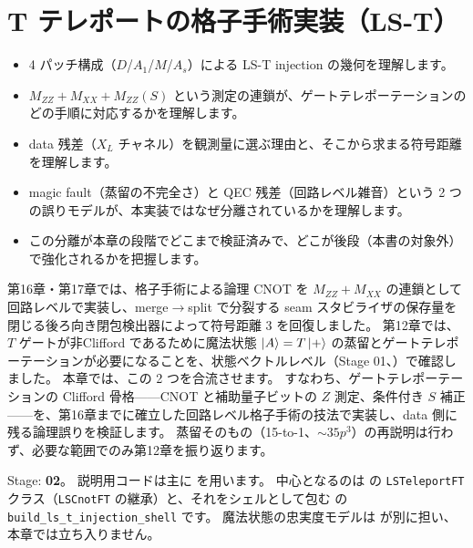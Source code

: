 \chapter{T テレポートの格子手術実装（LS-T）}\label{ch:ls_t}

\begin{chaptergoal}
  \begin{itemize}
  \item 4 パッチ構成（$D$/$A_1$/$M$/$A_s$）による LS-T injection の幾何を理解します。
  \item $M_{ZZ}+M_{XX}+M_{ZZ}(S)$ という測定の連鎖が、ゲートテレポーテーションのどの手順に対応するかを理解します。
  \item data 残差（$X_L$ チャネル）を観測量に選ぶ理由と、そこから求まる符号距離を理解します。
  \item magic fault（蒸留の不完全さ）と QEC 残差（回路レベル雑音）という 2 つの誤りモデルが、本実装ではなぜ分離されているかを理解します。
  \item この分離が本章の段階でどこまで検証済みで、どこが後段（本書の対象外）で強化されるかを把握します。
  \end{itemize}
\end{chaptergoal}

第16章・第17章では、格子手術による論理 CNOT を $M_{ZZ}+M_{XX}$ の連鎖として回路レベルで実装し、merge$\to$split で分裂する seam スタビライザの保存量を閉じる後ろ向き閉包検出器によって符号距離 3 を回復しました。
第12章では、$T$ ゲートが非Clifford であるために魔法状態 $\ket{A}=T\ket{+}$ の蒸留とゲートテレポーテーションが必要になることを、状態ベクトルレベル（Stage 01、）で確認しました。
本章では、この 2 つを合流させます。
すなわち、ゲートテレポーテーションの Clifford 骨格——CNOT と補助量子ビットの $Z$ 測定、条件付き $S$ 補正——を、第16章までに確立した回路レベル格子手術の技法で実装し、data 側に残る論理誤りを検証します。
蒸留そのもの（15-to-1、$\sim35p^3$）の再説明は行わず、必要な範囲でのみ第12章を振り返ります。

\begin{notebox}
  Stage: \textbf{02}。
  説明用コードは主に  を用います。
  中心となるのは  の \texttt{LSTeleportFT} クラス（\texttt{LSCnotFT} の継承）と、それをシェルとして包む  の \texttt{build\_ls\_t\_injection\_shell} です。
  魔法状態の忠実度モデルは  が別に担い、本章では立ち入りません。
\end{notebox}

